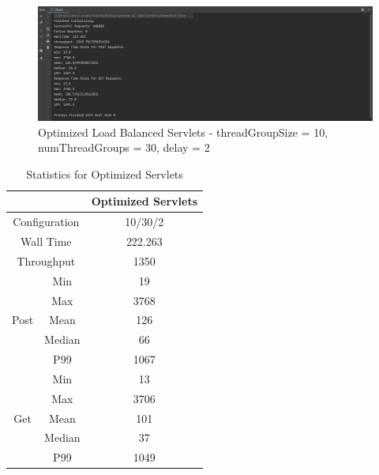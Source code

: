 \documentclass[a4paper,12pt]{article} %
\begin{document}
\begin{enumerate}
\begin{figure}[H]
    \centering
    \includegraphics[width=\textwidth]{images/optimized_30.png}
    \caption{Optimized Load Balanced Servlets - threadGroupSize = 10, numThreadGroups = 30, delay = 2}
\end{figure}

\begin{table}[H]
    \centering
    \begin{tabular}{|cc|c|}
    \hline
    \multicolumn{2}{|c|}{}                               & Optimized Servlets \\ \hline
    \multicolumn{2}{|c|}{Configuration}                  & 10/30/2            \\ \hline
    \multicolumn{2}{|c|}{Wall Time}                      & 222.263            \\ \hline
    \multicolumn{2}{|c|}{Throughput}                     & 1350               \\ \hline
    \multicolumn{1}{|c|}{\multirow{5}{*}{Post}} & Min    & 19                 \\ \cline{2-3} 
    \multicolumn{1}{|c|}{}                      & Max    & 3768               \\ \cline{2-3} 
    \multicolumn{1}{|c|}{}                      & Mean   & 126                \\ \cline{2-3} 
    \multicolumn{1}{|c|}{}                      & Median & 66                 \\ \cline{2-3} 
    \multicolumn{1}{|c|}{}                      & P99    & 1067               \\ \hline
    \multicolumn{1}{|c|}{\multirow{5}{*}{Get}}  & Min    & 13                 \\ \cline{2-3} 
    \multicolumn{1}{|c|}{}                      & Max    & 3706               \\ \cline{2-3} 
    \multicolumn{1}{|c|}{}                      & Mean   & 101                \\ \cline{2-3} 
    \multicolumn{1}{|c|}{}                      & Median & 37                 \\ \cline{2-3} 
    \multicolumn{1}{|c|}{}                      & P99    & 1049               \\ \hline
    \end{tabular}
    \caption{Statistics for Optimized Servlets}
\end{table}


\end{enumerate}
\end{document}
